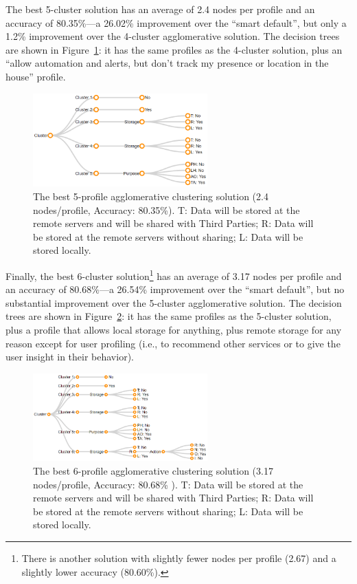 The best 5-cluster solution has an average of 2.4 nodes per profile and an accuracy of 80.35\%---a 26.02\% improvement over the ``smart default'', but only a 1.2\% improvement over the 4-cluster agglomerative solution. The decision trees are shown in Figure~\ref{fig:conglo_5_profile001}: it has the same profiles as the 4-cluster solution, plus an ``allow automation and alerts, but don't track my presence or location in the house'' profile.

\begin{figure}
	\centering
	\includegraphics[width=0.6\textwidth]{figures/conglo_5_profile001.png}
	\caption{The best 5-profile agglomerative clustering solution (2.4 nodes/profile, Accuracy: 80.35\%). T: Data will be stored at the remote servers and will be shared with Third Parties; R: Data will be stored at the remote servers without sharing; L: Data will be stored locally.}
	\label{fig:conglo_5_profile001}
\end{figure}

Finally, the best 6-cluster solution\footnote{There is another solution with slightly fewer nodes per profile (2.67) and a slightly lower accuracy (80.60\%).} has an average of 3.17 nodes per profile and an accuracy of 80.68\%---a 26.54\% improvement over the ``smart default'', but no substantial improvement over the 5-cluster agglomerative solution. The decision trees are shown in Figure~\ref{fig:conglo_6_profile001}: it has the same profiles as the 5-cluster solution, plus a profile that allows local storage for anything, plus remote storage for any reason except for user profiling (i.e., to recommend other services or to give the user insight in their behavior).

\begin{figure}
	\centering
	\includegraphics[width=0.6\textwidth]{figures/conglo_6_profile001.png}
	\caption{The best 6-profile agglomerative clustering solution (3.17 nodes/profile, Accuracy: 80.68\% ). T: Data will be stored at the remote servers and will be shared with Third Parties; R: Data will be stored at the remote servers without sharing; L: Data will be stored locally.}
	\label{fig:conglo_6_profile001}
\end{figure}

